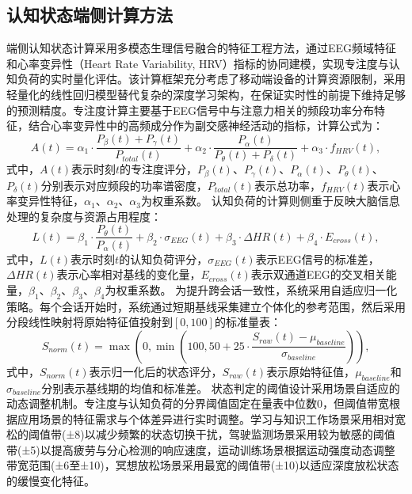 \subsection{认知状态端侧计算方法}
端侧认知状态计算采用多模态生理信号融合的特征工程方法，通过EEG频域特征和心率变异性（Heart Rate Variability, HRV）指标的协同建模，实现专注度与认知负荷的实时量化评估。该计算框架充分考虑了移动端设备的计算资源限制，采用轻量化的线性回归模型替代复杂的深度学习架构，在保证实时性的前提下维持足够的预测精度。专注度计算主要基于EEG信号中与注意力相关的频段功率分布特征，结合心率变异性中的高频成分作为副交感神经活动的指标，计算公式为：
\begin{equation}
A(t) = \alpha_1 \cdot \frac{P_{\beta}(t) + P_{\gamma}(t)}{P_{total}(t)} + \alpha_2 \cdot \frac{P_{\alpha}(t)}{P_{\theta}(t) + P_{\delta}(t)} + \alpha_3 \cdot f_{HRV}(t),
\end{equation}
式中，$A(t)$表示时刻$t$的专注度评分，$P_{\beta}(t)$、$P_{\gamma}(t)$、$P_{\alpha}(t)$、$P_{\theta}(t)$、$P_{\delta}(t)$分别表示对应频段的功率谱密度，$P_{total}(t)$表示总功率，$f_{HRV}(t)$表示心率变异性特征，$\alpha_1$、$\alpha_2$、$\alpha_3$为权重系数。
认知负荷的计算则侧重于反映大脑信息处理的复杂度与资源占用程度：
\begin{equation}
L(t) = \beta_1 \cdot \frac{P_{\theta}(t)}{P_{\alpha}(t)} + \beta_2 \cdot \sigma_{EEG}(t) + \beta_3 \cdot \Delta HR(t) + \beta_4 \cdot E_{cross}(t),
\end{equation}
式中，$L(t)$表示时刻$t$的认知负荷评分，$\sigma_{EEG}(t)$表示EEG信号的标准差，$\Delta HR(t)$表示心率相对基线的变化量，$E_{cross}(t)$表示双通道EEG的交叉相关能量，$\beta_1$、$\beta_2$、$\beta_3$、$\beta_4$为权重系数。
为提升跨会话一致性，系统采用自适应归一化策略。每个会话开始时，系统通过短期基线采集建立个体化的参考范围，然后采用分段线性映射将原始特征值投射到$[0, 100]$的标准量表：
\begin{equation}
S_{norm}(t) = \max(0, \min(100, 50 + 25 \cdot \frac{S_{raw}(t) - \mu_{baseline}}{\sigma_{baseline}})),
\end{equation}
式中，$S_{norm}(t)$表示归一化后的状态评分，$S_{raw}(t)$表示原始特征值，$\mu_{baseline}$和$\sigma_{baseline}$分别表示基线期的均值和标准差。
状态判定的阈值设计采用场景自适应的动态调整机制。专注度与认知负荷的分界阈值固定在量表中位数0，但阈值带宽根据应用场景的特征需求与个体差异进行实时调整。学习与知识工作场景采用相对宽松的阈值带(±8)以减少频繁的状态切换干扰，驾驶监测场景采用较为敏感的阈值带(±5)以提高疲劳与分心检测的响应速度，运动训练场景根据运动强度动态调整带宽范围(±6至±10)，冥想放松场景采用最宽的阈值带(±10)以适应深度放松状态的缓慢变化特征。



